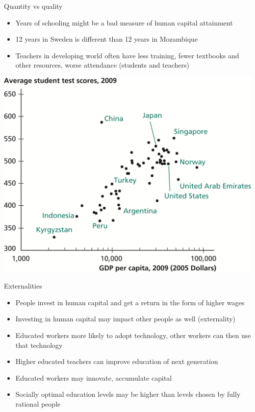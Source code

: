 \documentclass[10pt]{beamer}
\begin{document}
\begin{frame}[label={sec:org1498a74}]{}
\alert{Quantity vs quality}
\begin{itemize}
\item Years of schooling might be a bad measure of human capital attainment
\item 12 years in Sweden is different than 12 years in Mozambique
\item Teachers in developing world often have less training, fewer textbooks and other resources, worse attendance (students and teachers)
\end{itemize}
\end{frame}

\begin{frame}[label={sec:org6401cbb}]{}
\begin{center}
\includegraphics[width=.75\textwidth]{./img/6.13.png}
\end{center}
\end{frame}

\begin{frame}[label={sec:org293b9d1}]{}
\alert{Externalities}
\begin{itemize}
\item People invest in human capital and get a return in the form of higher wages
\item Investing in human capital may impact \alert{other} people as well (externality)
\item Educated workers more likely to adopt technology, other workers can then use that technology
\item Higher educated teachers can improve education of next generation
\item Educated workers may innovate, accumulate capital
\item Socially optimal education levels may be higher than levels chosen by fully rational people
\end{itemize}
\end{frame}
\end{document}

